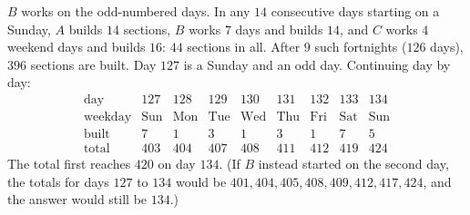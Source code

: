 $B$ works on the odd-numbered days. In any $14$ consecutive days starting on a Sunday, $A$ builds $14$ sections, $B$ works $7$ days and builds $14$, and $C$ works $4$ weekend days and builds $16$: $44$ sections in all. After $9$ such fortnights ($126$ days), $396$ sections are built. Day $127$ is a Sunday and an odd day. Continuing day by day:
\[
\begin{array}{c|ccccccccc}
\text{day} & 127 & 128 & 129 & 130 & 131 & 132 & 133 & 134\\
\text{weekday} & \text{Sun} & \text{Mon} & \text{Tue} & \text{Wed} & \text{Thu} & \text{Fri} & \text{Sat} & \text{Sun}\\
\text{built} & 7 & 1 & 3 & 1 & 3 & 1 & 7 & 5\\
\text{total} & 403 & 404 & 407 & 408 & 411 & 412 & 419 & 424
\end{array}
\]
The total first reaches $420$ on day $\boxed{134}$. (If $B$ instead started on the second day, the totals for days $127$ to $134$ would be $401,404,405,408,409,412,417,424$, and the answer would still be $134$.)
